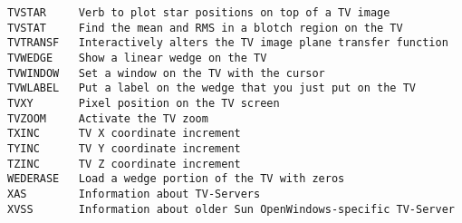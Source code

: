 \begin{verbatim}
TVSTAR     Verb to plot star positions on top of a TV image
TVSTAT     Find the mean and RMS in a blotch region on the TV
TVTRANSF   Interactively alters the TV image plane transfer function
TVWEDGE    Show a linear wedge on the TV
TVWINDOW   Set a window on the TV with the cursor
TVWLABEL   Put a label on the wedge that you just put on the TV
TVXY       Pixel position on the TV screen
TVZOOM     Activate the TV zoom
TXINC      TV X coordinate increment
TYINC      TV Y coordinate increment
TZINC      TV Z coordinate increment
WEDERASE   Load a wedge portion of the TV with zeros
XAS        Information about TV-Servers
XVSS       Information about older Sun OpenWindows-specific TV-Server
\end{verbatim}\eve

\vfill\eject
{}

